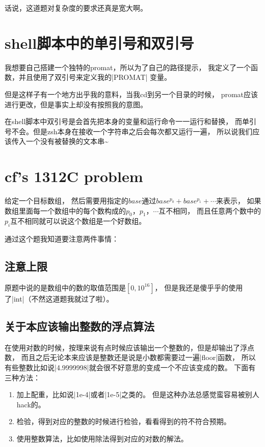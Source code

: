 话说，这道题对复杂度的要求还真是宽大啊。


\section{shell脚本中的单引号和双引号}

我想要自己搭建一个独特的promat，所以为了自己的路径提示，
我定义了一个函数，并且使用了双引号来定义我的\vb|PROMAT|
变量。

但是这样子有一个地方出乎我的意料，当我cd到另一个目录的时候，
promat应该进行更改，但是事实上却没有按照我的意图。

在shell脚本中双引号是会首先把本身的变量和运行命令一一运行和替换，
而单引号不会。但是zsh本身在接收一个字符串之后会每次都又运行一遍，
所以说我们应该传入一个没有被替换的文本串\~{}


\section{cf's 1312C problem}

给定一个目标数组，
然后需要用指定的$base$通过$base^{p_0}+base^{p_1}+\cdots$来表示，
如果数组里面每一个数组中的每个数构成的$p_0$，$p_1$，$\cdots$互不相同，
而且任意两个数中的$p_i$互不相同就可以说这个数组是一个好数组。

通过这个题我知道要注意两件事情：

\subsection{注意上限}
原题中说的是数组中的数的取值范围是$[0,10^{16}]$，
但是我还是傻乎乎的使用了\vb|int|（不然这道题我就过了啦）。

\subsection{关于本应该输出整数的浮点算法}
在使用对数的时候，按理来说有点时候应该输出一个整数的，但是却输出了浮点数，
而且之后无论本来应该是整数还是说是小数都需要过一遍\vb|floor|函数，
所以有些整数比如说\vb|4.9999998|就会很不好意思的变成一个不应该变成的数。
下面有三种方法：

\begin{enumerate}
\item 加上配重，比如说\vb|1e-4|或者\vb|1e-5|之类的。
      但是这种办法总感觉蛮容易被别人hack的。
\item 检验，得到对应的整数的时候进行检验，看看得到的符不符合预期。
\item 使用整数算法，比如使用除法得到对应的对数的解法。
\end{enumerate}


